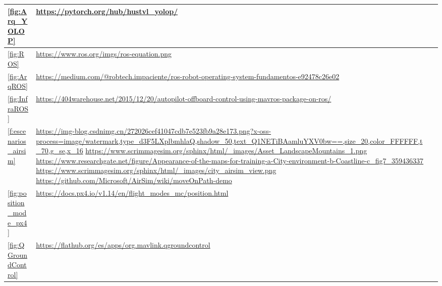 \begin{tabular}{ | m{4cm} | m{10cm}| m{1cm} | }

    \hline
    \ref{fig:Arq_YOLOP} & \url{https://pytorch.org/hub/hustvl_yolop/} \\
    \hline
    \ref{fig:ROS} & \url{https://www.ros.org/imgs/ros-equation.png} \\
    \hline
    \ref{fig:ArqROS} & \url{https://medium.com/@robtech.impaciente/ros-robot-operating-system-fundamentos-e92478c26e02} \\
    \hline
    \ref{fig:InfraROS} & \url{https://404warehouse.net/2015/12/20/autopilot-offboard-control-using-mavros-package-on-ros/} \\
    \hline
    \ref{f:escenarios_airsim} & \url{https://img-blog.csdnimg.cn/272026cef41047cdb7e523fb9a28e173.png?x-oss-process=image/watermark,type_d3F5LXplbmhlaQ,shadow_50,text_Q1NETiBAamluYXV0bw==,size_20,color_FFFFFF,t_70,g_se,x_16} \newline
    \url{https://www.scrimmagesim.org/sphinx/html/_images/Asset_LandscapeMountains_1.png} \newline
    \url{https://www.researchgate.net/figure/Appearance-of-the-maps-for-training-a-City-environment-b-Coastline-c_fig7_359436337} \newline
    \url{https://www.scrimmagesim.org/sphinx/html/_images/city_airsim_view.png} \newline
    \url{https://github.com/Microsoft/AirSim/wiki/moveOnPath-demo} \\
    \hline
    \ref{fig:position_mode_px4} & \url{https://docs.px4.io/v1.14/en/flight_modes_mc/position.html} \\
    \hline
    \ref{fig:QGroundControl} & \url{https://flathub.org/es/apps/org.mavlink.qgroundcontrol} \\
    \hline

\end{tabular}




